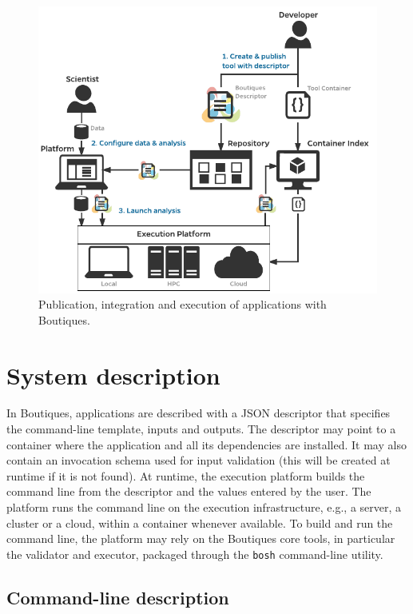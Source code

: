\documentclass[a4paper,num-refs]{oup-contemporary}
\newcommand{\boutiques}{Boutiques\xspace}
\begin{document}
\begin{figure}
  \includegraphics[width=\columnwidth]{boutiquesfig1.pdf}
  \caption{Publication, integration and execution of applications with \boutiques.}
  \label{fig:diagram}
\end{figure}

\section{System description}

In \boutiques, applications are described with a JSON descriptor that
specifies the command-line template, inputs and outputs. The
descriptor may point to a container where the application and all its
dependencies are installed. It may also contain an invocation schema
used for input validation (this will be created at runtime if it is
not found). At runtime, the execution platform builds the command line
from the descriptor and the values entered by the user. The platform runs
the command line on the execution infrastructure, e.g., a server, a
cluster or a cloud, within a container whenever available. To build
and run the command line, the platform may rely on the \boutiques core
tools, in particular the validator and executor, packaged through the
\texttt{bosh} command-line utility.

\subsection{Command-line description}
\end{document}
